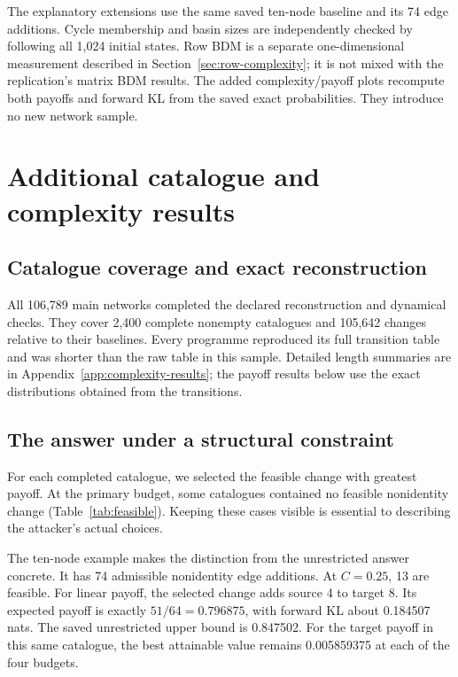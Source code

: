 \documentclass[11pt,a4paper]{article}
\begin{document}
The explanatory extensions use the same saved ten-node baseline and its
74 edge additions. Cycle membership and basin sizes are independently
checked by following all 1,024 initial states. Row BDM is a separate
one-dimensional measurement described in Section~\ref{sec:row-complexity};
it is not mixed with the replication's matrix BDM results. The added
complexity/payoff plots recompute both payoffs and forward KL from the
saved exact probabilities. They introduce no new network sample.

\section{Additional catalogue and complexity results}\label{app:catalogues}
\subsection{Catalogue coverage and exact reconstruction}
All 106,789 main networks completed the declared reconstruction and
dynamical checks. They cover 2,400 complete nonempty catalogues and
105,642 changes relative to their baselines. Every programme reproduced
its full transition table and was shorter than the raw table in this
sample. Detailed length summaries are in
Appendix~\ref{app:complexity-results}; the payoff results below use the
exact distributions obtained from the transitions.

\subsection{The answer under a structural constraint}
For each completed catalogue, we selected the feasible change with greatest
payoff. At the primary budget, some catalogues contained no feasible
nonidentity change (Table~\ref{tab:feasible}). Keeping these cases visible
is essential to describing the attacker's actual choices.

\begin{table}[htbp]\centering\small

\caption{Is there any allowed change below the alarm budget? Counts use
$C=0.25$ and all 1,200 bases per perturbation kind. Feasibility depends on
the distributional constraint, so the two payoff definitions give the same
feasibility counts. An unavailable optimum is not assigned payoff zero.}
\label{tab:feasible}
\end{table}

The ten-node example makes the distinction from the unrestricted answer
concrete. It has 74 admissible nonidentity edge additions. At $C=0.25$,
13 are feasible. For linear payoff, the selected change adds source 4 to
target 8. Its expected payoff is exactly $51/64=0.796875$, with forward
KL about 0.184507 nats. The saved unrestricted upper bound is 0.847502.
For the target payoff in this same catalogue, the best attainable value
remains 0.005859375 at each of the four budgets.
\end{document}
